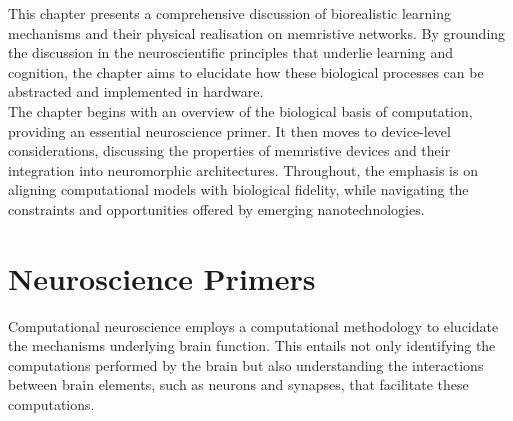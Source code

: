 \noindent This chapter presents a comprehensive discussion of biorealistic learning mechanisms and their physical realisation on memristive networks. By grounding the discussion in the neuroscientific principles that underlie learning and cognition, the chapter aims to elucidate how these biological processes can be abstracted and implemented in hardware. \\

\noindent The chapter begins with an overview of the biological basis of computation, providing an essential neuroscience primer. It then moves to device-level considerations, discussing the properties of memristive devices and their integration into neuromorphic architectures. Throughout, the emphasis is on aligning computational models with biological fidelity, while navigating the constraints and opportunities offered by emerging nanotechnologies.

\section[Neuroscience Primers]{Neuroscience Primers}

Computational neuroscience employs a computational methodology to elucidate the mechanisms underlying brain function. This entails not only identifying the computations performed by the brain but also understanding the interactions between brain elements, such as neurons and synapses, that facilitate these computations.\\




